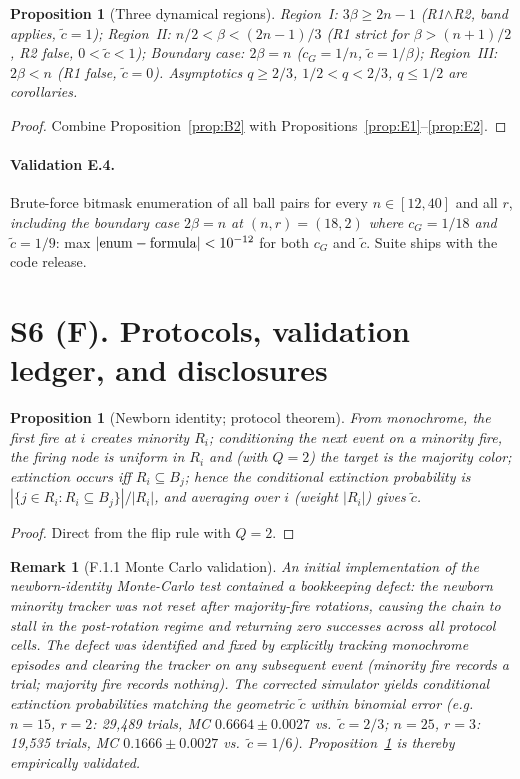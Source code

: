 \documentclass[preprint,12pt]{elsarticle}
\newtheorem{proposition}[theorem]{Proposition}
\newtheorem{remark}{Remark}[theorem]
\newcommand{\ctil}{\tilde{c}}
\newcommand{\cG}{c_G}
\begin{document}
\begin{proposition}[Three dynamical regions]
\label{prop:E3}
Region~I: $3\beta\ge2n-1$ (R1$\wedge$R2, band applies, $\ctil=1$); Region~II: $n/2<\beta<(2n-1)/3$ (R1 strict for $\beta>(n+1)/2$, R2 false, $0<\ctil<1$); Boundary case: $2\beta=n$ ($\cG=1/n$, $\ctil=1/\beta$); Region~III: $2\beta< n$ (R1 false, $\ctil=0$). Asymptotics $q\ge2/3$, $1/2<q<2/3$, $q\le1/2$ are corollaries.
\end{proposition}
\begin{proof}
Combine Proposition~\ref{prop:B2} with
Propositions~\ref{prop:E1}--\ref{prop:E2}.
\end{proof}

\paragraph{Validation E.4.}
Brute-force bitmask enumeration of all ball pairs for every
$n\in[12,40]$ and all $r$, \emph{including the boundary case $2\beta=n$
at $(n,r)=(18,2)$ where $\cG=1/18$ and $\ctil=1/9$}: max
$|{\rm enum}-{\rm formula}|<10^{-12}$ for both $\cG$ and $\ctil$. Suite
ships with the code release.

\section{S6 (F). Protocols, validation ledger, and disclosures}
\label{sec:F}

\begin{proposition}[Newborn identity; protocol theorem]
\label{prop:F1}
From monochrome, the first fire at $i$ creates minority $R_i$;
conditioning the next event on a minority fire, the firing node is
uniform in $R_i$ and (with $Q=2$) the target is the majority color;
extinction occurs iff $R_i\subseteq B_j$; hence the conditional
extinction probability is
$|\{j\in R_i:R_i\subseteq B_j\}|/|R_i|$, and averaging over $i$ (weight
$|R_i|$) gives $\ctil$.
\end{proposition}
\begin{proof}
Direct from the flip rule with $Q=2$.
\end{proof}
\begin{remark}[F.1.1 Monte Carlo validation]
\label{rem:F1.1}
An initial implementation of the newborn-identity Monte-Carlo test
contained a bookkeeping defect: the newborn minority tracker was not
reset after majority-fire rotations, causing the chain to stall in the
post-rotation regime and returning zero successes across all protocol
cells. The defect was identified and fixed by explicitly tracking
monochrome episodes and clearing the tracker on any subsequent event
(minority fire records a trial; majority fire records nothing). The
corrected simulator yields conditional extinction probabilities matching
the geometric $\ctil$ within binomial error (e.g.\ $n=15$, $r=2$:
29,489 trials, MC $0.6664\pm0.0027$ vs.\ $\ctil=2/3$; $n=25$, $r=3$:
19,535 trials, MC $0.1666\pm0.0027$ vs.\ $\ctil=1/6$).
Proposition~\ref{prop:F1} is thereby empirically validated.
\end{remark}
\end{document}
